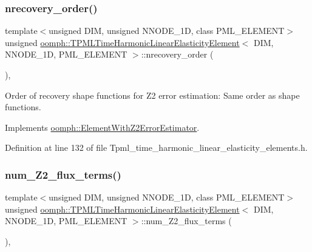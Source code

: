 \subsubsection{\texorpdfstring{nrecovery\+\_\+order()}{nrecovery\_order()}}
{\footnotesize\ttfamily template$<$unsigned D\+IM, unsigned N\+N\+O\+D\+E\+\_\+1D, class P\+M\+L\+\_\+\+E\+L\+E\+M\+E\+NT$>$ \\
unsigned \hyperlink{classoomph_1_1TPMLTimeHarmonicLinearElasticityElement}{oomph\+::\+T\+P\+M\+L\+Time\+Harmonic\+Linear\+Elasticity\+Element}$<$ D\+IM, N\+N\+O\+D\+E\+\_\+1D, P\+M\+L\+\_\+\+E\+L\+E\+M\+E\+NT $>$\+::nrecovery\+\_\+order (\begin{DoxyParamCaption}{ }\end{DoxyParamCaption})\hspace{0.3cm}{\ttfamily [inline]}, {\ttfamily [virtual]}}



Order of recovery shape functions for Z2 error estimation\+: Same order as shape functions. 



Implements \hyperlink{classoomph_1_1ElementWithZ2ErrorEstimator_af39480835bd3e0f6b2f4f7a9a4044798}{oomph\+::\+Element\+With\+Z2\+Error\+Estimator}.



Definition at line 132 of file Tpml\+\_\+time\+\_\+harmonic\+\_\+linear\+\_\+elasticity\+\_\+elements.\+h.

\mbox{\label{classoomph_1_1TPMLTimeHarmonicLinearElasticityElement_ac7cb9f7b5a5194e5f27df25fa2c6fb50}} 
\subsubsection{\texorpdfstring{num\+\_\+\+Z2\+\_\+flux\+\_\+terms()}{num\_Z2\_flux\_terms()}}
{\footnotesize\ttfamily template$<$unsigned D\+IM, unsigned N\+N\+O\+D\+E\+\_\+1D, class P\+M\+L\+\_\+\+E\+L\+E\+M\+E\+NT$>$ \\
unsigned \hyperlink{classoomph_1_1TPMLTimeHarmonicLinearElasticityElement}{oomph\+::\+T\+P\+M\+L\+Time\+Harmonic\+Linear\+Elasticity\+Element}$<$ D\+IM, N\+N\+O\+D\+E\+\_\+1D, P\+M\+L\+\_\+\+E\+L\+E\+M\+E\+NT $>$\+::num\+\_\+\+Z2\+\_\+flux\+\_\+terms (\begin{DoxyParamCaption}{ }\end{DoxyParamCaption})\hspace{0.3cm}{\ttfamily [inline]}, {\ttfamily [virtual]}}



